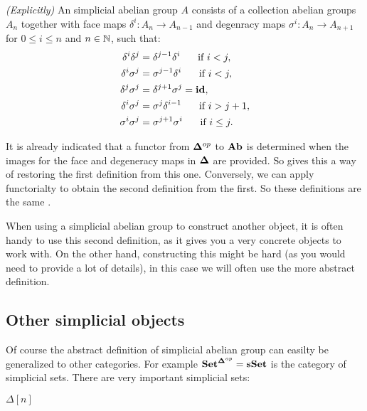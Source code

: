\begin{definition}
	\emph{(Explicitly)} An simplicial abelian group $A$ consists of a collection abelian groups $A_n$ together with face maps $\delta^i : A_n \to A_{n-1}$ and degenracy maps $\sigma^i : A_n \to A_{n+1}$ for $0 \leq i \leq n$ and $n \in \mathbb{N}$, such that:
	\begin{align}
		\delta^i\delta^j &= \delta^{j-1}\delta^i  \hspace{0.5cm} \text{ if } i < j,\\
		\delta^i\sigma^j &= \sigma^{j-1}\delta^i  \hspace{0.5cm} \text{ if } i < j,\\
		\delta^j\sigma^j &= \delta^{j+1}\sigma^j = \mathbf{id},\\
		\delta^i\sigma^j &= \sigma^j\delta^{i-1}  \hspace{0.5cm} \text{ if } i > j+1,\\
		\sigma^i\sigma^j &= \sigma^{j+1}\sigma^i  \hspace{0.5cm} \text{ if } i \leq j.
	\end{align}
\end{definition}

It is already indicated that a functor from $\mathbf{\Delta}^{op}$ to $\mathbf{Ab}$ is determined when the images for the face and degeneracy maps in $\mathbf{\Delta}$ are provided. So gives this a way of restoring the first definition from this one. Conversely, we can apply functorialty to obtain the second definition from the first. So these definitions are the same .

When using a simplicial abelian group to construct another object, it is often handy to use this second definition, as it gives you a very concrete objects to work with. On the other hand, constructing this might be hard (as you would need to provide a lot of details), in this case we will often use the more abstract definition.


\subsection{Other simplicial objects}
Of course the abstract definition of simplicial abelian group can easilty be generalized to other categories. For example $\mathbf{Set}^{\mathbf{\Delta}^{op}} = \mathbf{sSet}$ is the category of simplicial sets. There are very important simplicial sets:

\begin{definition}
	$\Delta[n]$
\end{definition}



